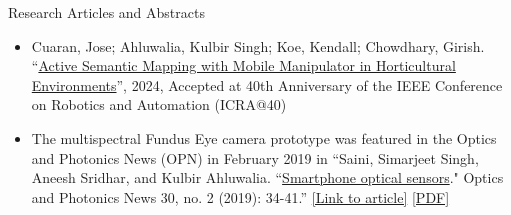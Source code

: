 \documentclass{resume} %
\begin{document}



\begin{rSection}{Research Articles and Abstracts}
\begin{itemize}[noitemsep]

    \item Cuaran, Jose; Ahluwalia, Kulbir Singh; Koe, Kendall; Chowdhary, Girish. ``\ul{Active Semantic Mapping with Mobile Manipulator in Horticultural Environments}'', 2024, Accepted at 40th Anniversary of the IEEE Conference on Robotics and Automation (ICRA@40)
    

    
    \item The multispectral Fundus Eye camera prototype was featured in the Optics and Photonics News (OPN) in February 2019 in ``Saini, Simarjeet Singh, Aneesh Sridhar, and Kulbir Ahluwalia. ``\ul{Smartphone optical sensors}." Optics and Photonics News 30, no. 2 (2019): 34-41.''
    \href{https://doi.org/10.1364/OPN.30.2.000034}{[Link to article]} \href{https://drive.google.com/file/d/13tBo4hi6o6TkS_Gl4OcwjkOrUnuKTecq/view?usp=sharing}{[PDF]} 
\end{itemize}
\end{rSection}
\end{document}
